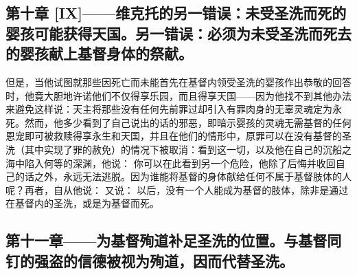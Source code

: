 
\subsection{第十章 [IX]——维克托的另一错误：未受圣洗而死的婴孩可能获得天国。另一错误：必须为未受圣洗而死去的婴孩献上基督身体的祭献。}

但是，当他试图就那些因死亡而未能首先在基督内领受圣洗的婴孩作出恭敬的回答时，他竟大胆地许诺他们不仅得享乐园，而且得享天国——因为他找不到其他办法来避免这样说：天主将那些没有任何先前罪过却引入有罪肉身的无辜灵魂定为永死。然而，他多少看到了自己说出的话的邪恶，即暗示婴孩的灵魂无需基督的任何恩宠即可被救赎得享永生和天国，并且在他们的情形中，原罪可以在没有基督的圣洗（其中实现了罪的赦免）的情况下被取消：看到这一切，以及他在自己的沉船之海中陷入何等的深渊，他说： 你可以在此看到另一个危险，他除了后悔并收回自己的话之外，永远无法逃脱。因为谁能将基督的身体献给任何不属于基督肢体的人呢？再者，自从他说： 又说： 以后，没有一个人能成为基督的肢体，除非是通过在基督内的圣洗，或是为基督而死。\par


\subsection{第十一章——为基督殉道补足圣洗的位置。与基督同钉的强盗的信德被视为殉道，因而代替圣洗。}

